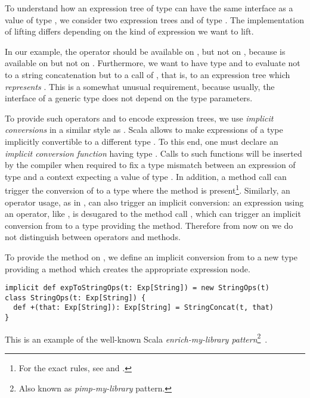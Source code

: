 To understand how an expression tree of type  can have the same interface as a value of type , we consider two expression trees  and  of type . The implementation of lifting differs depending on the kind of expression we want to lift.

In our example, the operator \code{+} should be available on , but not on , because \code{+} is available on  but not on .
Furthermore, we want  to have type  and to evaluate not to a string concatenation but to a call of , that is, to an expression tree which \emph{represents} . This is a somewhat unusual requirement, because usually, the interface of a generic type does not depend on the type parameters.

To provide such operators and to encode expression trees, we use \emph{implicit conversions} in a similar style as \citet{rompf2010lightweight}. Scala allows to make expressions of a type  implicitly convertible to a different type . To this end, one must declare an \emph{implicit conversion function} having type . Calls to such functions will be inserted by the compiler when required to fix a type mismatch between an expression of type  and a context expecting a value of type . In addition, a method call  can trigger the conversion of  to a type where the method  is present\footnote{For the exact rules, see \citet[Ch.~21]{Odersky11book} and \citet{ScalaRef}.}. Similarly, an operator usage, as in , can also trigger an implicit conversion: an expression using an operator, like , is desugared to the method call , which can trigger an implicit conversion from  to a type providing the \code{+} method. Therefore from now on we do not distinguish between operators and methods.

To provide the method \code{+} on , we define an implicit conversion from  to a new type providing a \code{+} method which creates the appropriate expression node.
\begin{lstlisting}
implicit def expToStringOps(t: Exp[String]) = new StringOps(t)
class StringOps(t: Exp[String]) {
  def +(that: Exp[String]): Exp[String] = StringConcat(t, that)
}
\end{lstlisting}
This is an example of the well-known Scala \emph{enrich-my-library pattern}\footnote{Also known as \emph{pimp-my-library} pattern.}~\citep{OderskyPimpLib}.
 
